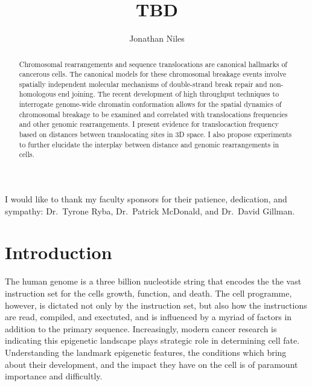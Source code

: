 \documentclass[phd,tocprelim]{cornell}
\title{TBD}
\author{Jonathan Niles}
\begin{document}
\maketitle
\makecopyright%

\begin{abstract}
Chromosomal rearrangements and sequence translocations are
canonical hallmarks of cancerous cells.  The canonical models
for these chromosomal breakage events involve spatially
independent molecular mechanisms of double-strand break
repair and non-homologous end joining.  The recent development of high
throughput techniques to interrogate genome-wide chromatin
conformation allows for the spatial dynamics of chromosomal
breakage to be examined and correlated with translocations
frequencies and other genomic rearrangements.  I present
evidence for translocaction frequency based on distances between
translocating sites in 3D space.  I also propose experiments
to further elucidate the interplay between distance and
genomic rearrangements in cells.
\end{abstract}


\begin{acknowledgements}
I would like to thank my faculty sponsors for their patience,
dedication, and sympathy: Dr.\ Tyrone Ryba, Dr.\ Patrick McDonald,
and Dr.\ David Gillman.
\end{acknowledgements}

\contentspage%
\tablelistpage%
\figurelistpage%

\normalspacing\setcounter{page}{1}
\pagestyle{cornell} \addtolength{\parskip}{0.5\baselineskip}

\chapter{Introduction}

The human genome is a three billion nucleotide string that encodes the
the vast instruction set for the cells growth, function, and death.  The cell
programme, however, is dictated not only by the instruction set, but also
how the instructions are read, compiled, and exectuted, and is influenced
by a myriad of factors in addition to the primary sequence.  Increasingly,
modern cancer research is indicating this epigenetic landscape plays strategic
role in determining cell fate.  Understanding the landmark epigenetic features,
the conditions which bring about their development, and the impact they have on
the cell is of paramount importance and difficultly.
\end{document}
